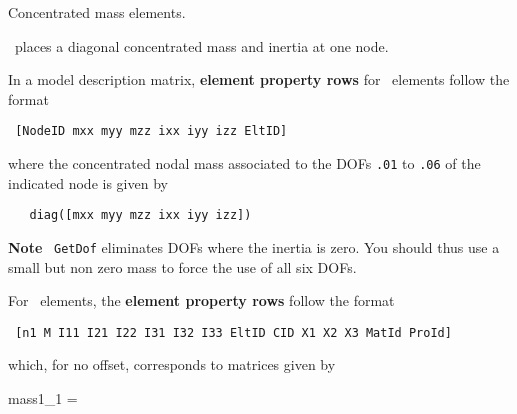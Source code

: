 
\elem


Concentrated mass elements.



   \mass\   places a diagonal concentrated mass and inertia at one node.


\noindent  In a model description matrix, {\bf element property rows} for \mass\   elements follow the format 

\begin{verbatim}
 [NodeID mxx myy mzz ixx iyy izz EltID]
\end{verbatim}


\noindent  where the concentrated nodal mass associated to the DOFs {\tt .01} to {\tt .06} of the indicated node is given by

\begin{verbatim}
   diag([mxx myy mzz ixx iyy izz])
\end{verbatim}


{\bf Note} \feutil\ {\tt GetDof} eliminates DOFs where the inertia is zero. You should thus use a small but non zero mass to force the use of all six DOFs.

For \massb\ elements, the {\bf element property rows} follow the format
\begin{verbatim}
 [n1 M I11 I21 I22 I31 I32 I33 EltID CID X1 X2 X3 MatId ProId]
\end{verbatim}


which, for no offset, corresponds to matrices given by

\begin{eqsvg}{mass1_1}
 =
\end{eqsvg}

